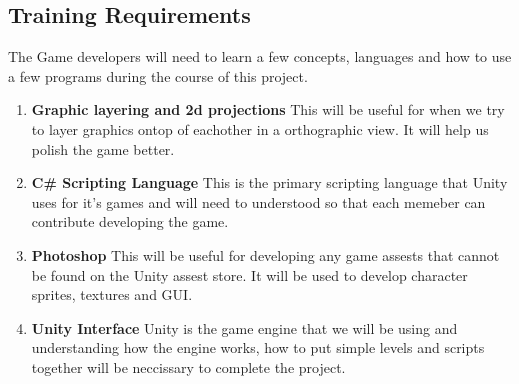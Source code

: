 \documentclass{article}
\begin{document}
\subsection{Training Requirements}
\quad The Game developers will need to learn a few concepts, languages and how to use a few programs during the course of this project.
\begin{enumerate}
	\item \textbf{Graphic layering and 2d projections} This will be useful for when we try to layer graphics ontop of eachother in a orthographic view. It will help us polish the game better.
	\item \textbf{C\# Scripting Language} This is the primary scripting language that Unity uses for it's games and will need to understood so that each memeber can contribute developing the game.
	\item \textbf{Photoshop} This will be useful for developing any game assests that cannot be found on the Unity assest store. It will be used to develop character sprites, textures and GUI.
	\item \textbf{Unity Interface} Unity is the game engine that we will be using and understanding how the engine works, how to put simple levels and scripts together will be neccissary to complete the project.
\end{enumerate}
\end{document}
